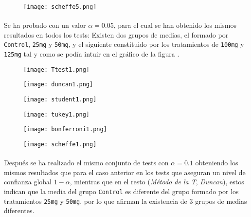 \documentclass{article}
\begin{document}
      \begin{figure}[H]
        \centering
        \texttt{[image: scheffe5.png]}
      \end{figure}

      \paragraph{}
      Se ha probado con un valor $\alpha = 0.05$, para el cual se han obtenido los mismos resultados en todos los tests: Existen dos grupos de medias, el formado por \texttt{Control}, \texttt{25mg} y \texttt{50mg}, y el siguiente constituido por los tratamientos de \texttt{100mg} y \texttt{125mg} tal y como se podía intuir en el gráfico de la figura \label{fig:figura_1}.

      \begin{figure}[H]
        \centering
        \texttt{[image: Ttest1.png]}
      \end{figure}
      \begin{figure}[H]
        \centering
        \texttt{[image: duncan1.png]}
      \end{figure}
      \begin{figure}[H]
        \centering
        \texttt{[image: student1.png]}
      \end{figure}

      \begin{figure}[H]
        \centering
        \texttt{[image: tukey1.png]}
      \end{figure}

      \begin{figure}[H]
        \centering
        \texttt{[image: bonferroni1.png]}
      \end{figure}

      \begin{figure}[H]
        \centering
        \texttt{[image: scheffe1.png]}
      \end{figure}

      \paragraph{}
      Después se ha realizado el mismo conjunto de tests con $\alpha = 0.1$ obteniendo los mismos resultados que para el caso anterior en los tests que aseguran un nivel de confianza global $1-\alpha$, mientras que en el resto (\emph{Método de la T}, \emph{Duncan}), estos indican que la media del grupo \texttt{Control} es diferente del grupo formado por los tratamientos \texttt{25mg} y \texttt{50mg}, por lo que afirman la existencia de 3 grupos de medias diferentes.
\end{document}
